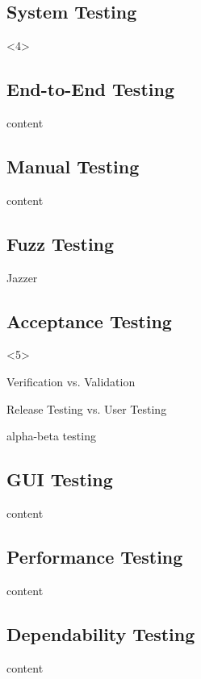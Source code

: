 \subsection{System Testing}
\begin{frame}<4>{\insertsubsection}
	\slideStagesTesting
\end{frame}

\subsection{End-to-End Testing}
\begin{frame}{\insertsubsection}
	content
\end{frame}

\subsection{Manual Testing}
\begin{frame}{\insertsubsection}
	content
\end{frame}

\subsection{Fuzz Testing}
\begin{frame}{\insertsubsection}
	Jazzer
\end{frame}

\subsection{Acceptance Testing}
\begin{frame}<5>{\insertsubsection}
	\slideStagesTesting
\end{frame}

\begin{frame}{\insertsubsection}
	Verification vs. Validation
	
	Release Testing vs. User Testing
	
	alpha-beta testing
\end{frame}

\subsection{GUI Testing}
\begin{frame}{\insertsubsection}
	content
\end{frame}

\subsection{Performance Testing}
\begin{frame}{\insertsubsection}
	content
\end{frame}

\subsection{Dependability Testing}
\begin{frame}{\insertsubsection}
	content
\end{frame}